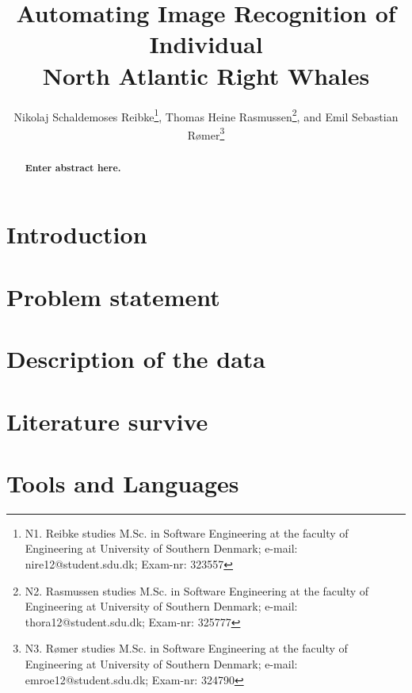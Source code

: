 \documentclass[10pt,a4paper,twocolumn]{article}
\begin{document}
\title{\textbf{Automating Image Recognition of Individual \\ North Atlantic Right Whales}}

\author{Nikolaj Schaldemoses Reibke\thanks{N1. Reibke studies M.Sc. in Software Engineering at the faculty of Engineering at University of Southern Denmark; e-mail: nire12@student.sdu.dk; Exam-nr: 323557},
		Thomas Heine Rasmussen\thanks{N2. Rasmussen studies M.Sc. in Software Engineering at the faculty of Engineering at University of Southern Denmark; e-mail: thora12@student.sdu.dk; Exam-nr: 325777},
        and Emil Sebastian R{\o}mer\thanks{N3. R{\o}mer studies M.Sc. in Software Engineering at the faculty of Engineering at University of Southern Denmark; e-mail: emroe12@student.sdu.dk; Exam-nr: 324790}
}

\maketitle

\begin{abstract}
\textbf{Enter abstract here.}
\end{abstract}

\section{Introduction}


\section{Problem statement}
\label{sec:problem-statement}


\section{Description of the data}
\label{sec:descr-of-data}


\section{Literature survive}


\section{Tools and Languages}

\end{document}
